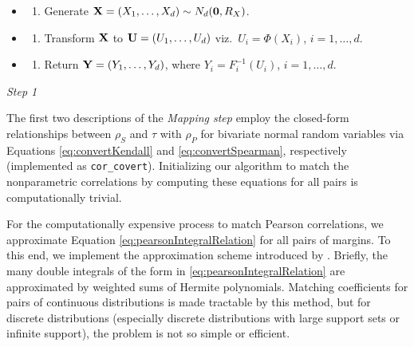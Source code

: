 \documentclass[
]{jss}
\providecommand{\tightlist}{%
  \setlength{\itemsep}{0pt}\setlength{\parskip}{0pt}}
\begin{document}
\begin{enumerate}
  \begin{itemize}
  \item
    \begin{enumerate}
    \def\labelenumii{(\roman{enumii})}
    \tightlist
    \item
      Generate \({\bf X}=(X_1, \ldots, X_d) \sim N_d({\bf 0}, R_X)\).
    \end{enumerate}
  \item
    \begin{enumerate}
    \def\labelenumii{(\roman{enumii})}
    \setcounter{enumii}{1}
    \tightlist
    \item
      Transform \({\bf X}\) to \({\bf U} = (U_1, \ldots, U_d)\) viz.~\(U_i=\Phi(X_i)\), \(i=1, \ldots, d\).
    \end{enumerate}
  \item
    \begin{enumerate}
    \def\labelenumii{(\roman{enumii})}
    \setcounter{enumii}{2}
    \tightlist
    \item
      Return \({\bf Y} = (Y_1, \ldots, Y_d)\), where \(Y_i=F_i^{-1}(U_i)\), \(i=1, \ldots, d\).
    \end{enumerate}
  \end{itemize}
\end{enumerate}


\emph{Step 1}

The first two descriptions of the \emph{Mapping step} employ the closed-form relationships between \(\rho_S\) and \(\tau\) with \(\rho_P\) for bivariate normal random variables via Equations \eqref{eq:convertKendall} and \eqref{eq:convertSpearman}, respectively (implemented as \texttt{cor\_covert}). Initializing our algorithm to match the nonparametric correlations by computing these equations for all pairs is computationally trivial.

For the computationally expensive process to match Pearson correlations, we approximate Equation \eqref{eq:pearsonIntegralRelation} for all pairs of margins. To this end, we implement the approximation scheme introduced by \citet{xiao2019matching}. Briefly, the many double integrals of the form in \eqref{eq:pearsonIntegralRelation} are approximated by weighted sums of Hermite polynomials. Matching coefficients for pairs of continuous distributions is made tractable by this method, but for discrete distributions (especially discrete distributions with large support sets or infinite support), the problem is not so simple or efficient.
\end{document}
